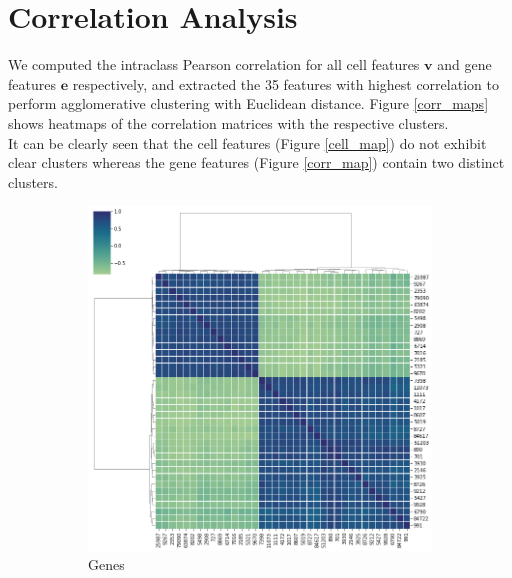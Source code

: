 \documentclass[bsc,frontabs,twoside,singlespacing,parskip,deptreport]{infthesis}     %
\let\Oldsection\section
\renewcommand{\section}{\FloatBarrier\Oldsection}
\begin{document}
\section{Correlation Analysis}
We computed the intraclass Pearson correlation for all cell features \(\mathbf{v}\) and gene features \(\mathbf{e}\) respectively, and extracted the 35 features with highest correlation to perform agglomerative clustering with Euclidean distance. Figure \ref{corr_maps} shows heatmaps of the correlation matrices with the respective clusters.  \\
It can be clearly seen that the cell features (Figure \ref{cell_map}) do not exhibit clear clusters whereas the gene features (Figure \ref{corr_map}) contain two distinct clusters. 
\begin{figure}[h!]
\centering
\begin{subfigure}{.5\textwidth}
  \centering
  \includegraphics[width=.9\linewidth]{images/gene_corr.png}
  \caption{Genes}
  \label{gene_map}
\end{subfigure}%
\begin{subfigure}{.5\textwidth}
  \centering

\end{subfigure}
\end{figure}
\end{document}

